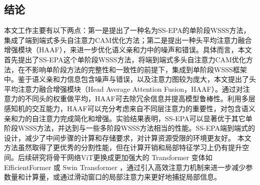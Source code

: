 \begin{CJK*}{UTF8}{zhhei}
    \vskip 1mm
    \section{结论}
\end{CJK*}

本文工作主要有以下两点：第一是提出了一种名为SS-EPA的单阶段WSSS方法，集成了端到端式多头自注意力CAM优化方法；第二是提出一种头平均注意力融合增强模块（HAAF），来进一步优化语义亲和力中的噪声和错误。具体而言，本文首先提出了SS-EPA这个单阶段WSSS方法，将端到端式多头自注意力CAM优化方法，在不影响单阶段方法的完整性和一致性的前提下，集成到单阶段WSSS框架中。鉴于语义亲和力信息包含噪声与错误，以及注意力图较为庞大，本文提出了头平均注意力融合增强模块（Head Average Attention Fusion，HAAF）。通过对注意力的不同头的权重做平均，HAAF可去除冗余信息并提高模型鲁棒性。利用多层感知机的交互能力，HAAF可以充分考虑来自不同层注意力的重要性，对包含语义亲和力的自注意力完成简化和增强。实验结果表明，SS-EPA可以显著优于其它单阶段WSSS方法，并达到与一些多阶段WSSS方法相当的性能。SS-EPA端到端式的设计，减少了中间步骤的计算和存储要求，对计算资源受限的环境更友好。
本文方法虽然取得了更优秀的分割性能，但在计算开销和局部特征学习上仍有提升空间。后续研究将骨干网络ViT更换成更加强大的 Transformer 变体如 EfficientFormer \cite{37li2022efficientformer}或 Swin Transformer \cite{38liu2021swin}，通过引入高效注意力机制来进一步减少参数量和计算量，或通过滑动窗口的局部注意力来更好地捕捉局部信息。
